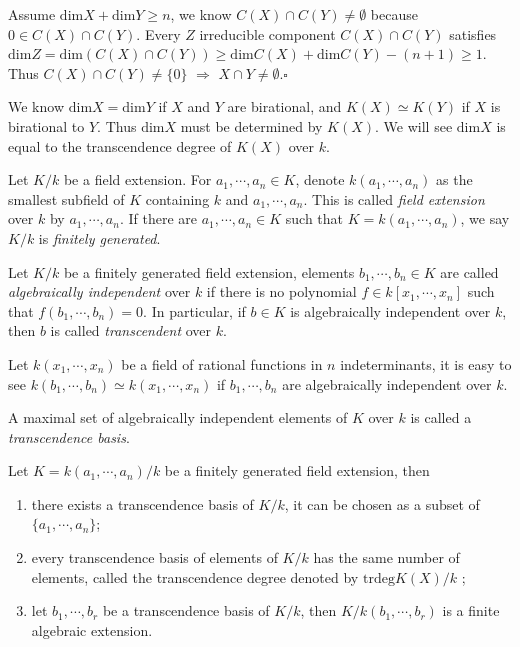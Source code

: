 	Assume $ \mathrm{dim}X+\mathrm{dim}Y\geq n $, we know $ C(X)\cap C(Y)\neq \emptyset $ because $ 0\in C(X)\cap C(Y) $. Every $ Z $ irreducible component $ C(X)\cap C(Y) $ satisfies $ \mathrm{dim}Z=\mathrm{dim}(C(X)\cap C(Y))\geq \mathrm{dim}C(X)+\mathrm{dim}C(Y)-(n+1)\geq 1 $. Thus $ C(X)\cap C(Y)\neq \lbrace 0 \rbrace $ $ \Rightarrow $ $ X\cap Y\neq \emptyset $.\hfill $\square $

We know $ \mathrm{dim}X=\mathrm{dim}Y $ if $ X $ and $ Y $ are birational, and $ K(X)\simeq K(Y) $ if $ X $ is birational to $ Y $. Thus $ \mathrm{dim}X $ must be determined by $ K(X) $. We will see $ \mathrm{dim}X $ is equal to the transcendence degree of $ K(X) $ over $ k $.
\begin{definition}
	Let $ K/k $ be a field extension. For $ a_1,\cdots,a_n\in K $, denote $ k(a_1,\cdots,a_n) $ as the smallest subfield of $ K $ containing $ k $ and $ a_1,\cdots,a_n $. This is called \textit{field extension} over $ k $ by $ a_1,\cdots,a_n $. If there are $ a_1,\cdots,a_n\in K $ such that $ K=k(a_1,\cdots,a_n) $, we say $ K/k $ is \textit{finitely generated}.
\end{definition}
\begin{definition}
	Let $ K/k $ be a finitely generated field extension, elements $ b_1,\cdots,b_n\in K $ are called \textit{algebraically independent} over $ k $ if there is no polynomial $ f\in k [x_1,\cdots,x_n] $ such that $ f(b_1,\cdots,b_n)=0 $. In particular, if $ b\in K $ is algebraically independent over $ k $, then $ b $ is called \textit{transcendent} over $ k $.
\end{definition}
Let $ k(x_1,\cdots,x_n) $ be a field of rational functions in $ n $ indeterminants, it is easy to see $ k(b_1,\cdots,b_n)\simeq k(x_1,\cdots,x_n) $ if $ b_1,\cdots,b_n $ are algebraically independent over $ k $.
\begin{definition}
	A maximal set of algebraically independent elements of $ K $ over $ k $ is called a \textit{transcendence basis}.
\end{definition}
\begin{theorem}
	Let $ K=k(a_1,\cdots,a_n)/k $ be a finitely generated field extension, then \begin{enumerate}
		\item there exists a transcendence basis of $ K/k $, it can be chosen as a subset of $ \lbrace a_1,\cdots,a_n\rbrace $;
		\item every transcendence basis of elements of $ K/k $ has the same number of elements, called the transcendence degree denoted by $\mathrm{trdeg}K(X)/k$ ;
		\item let $ b_1,\cdots,b_r $ be a transcendence basis of $ K/k $, then $ K/k(b_1,\cdots,b_r) $ is a finite algebraic extension.
	\end{enumerate}
\end{theorem}
